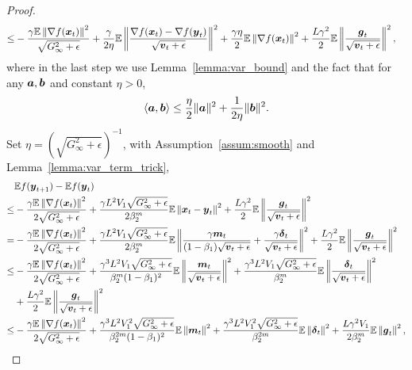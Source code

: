 \begin{proof}
\begin{align*}
\leq & -\frac{\gamma\mathbb E\left\|\nabla f(\boldsymbol{x}_t)\right\|^2}{\sqrt{G_\infty^2+\epsilon}} + \frac{\gamma}{2\eta}\mathbb E\left\| \frac{\nabla f(\boldsymbol{x}_t) - \nabla f(\boldsymbol{y}_t)}{\sqrt{\boldsymbol{v}_t+\epsilon}} \right\|^2 + \frac{\gamma\eta}{2}\mathbb E\left\| \nabla f(\boldsymbol{x}_t) \right\|^2 + \frac{L\gamma^2}{2}\mathbb E\left\| \frac{\boldsymbol{g}_{t}}{\sqrt{\boldsymbol{v}_t+\epsilon}}\right\|^2,
\end{align*}
where in the last step we use Lemma~\ref{lemma:var_bound} and the fact that for any $\boldsymbol{a},\boldsymbol{b}$ and constant $\eta>0$,
\begin{align*}
    \langle \boldsymbol{a},\boldsymbol{b} \rangle \leq \frac{\eta}{2}\|\boldsymbol{a}\|^2 + \frac{1}{2\eta}\|\boldsymbol{b}\|^2.
\end{align*}
Set $\eta=(\sqrt{G_\infty^2+\epsilon})^{-1}$, with Assumption~\ref{assum:smooth} and Lemma~\ref{lemma:var_term_trick},
\begin{align*}
& \mathbb E f(\*{y}_{t+1}) - \mathbb Ef(\*{y}_{t})\\
    \leq & -\frac{\gamma\mathbb E\left\| \nabla f(\*{x}_t)\right\|^2}{2\sqrt{G_\infty^2+\epsilon}} + \frac{\gamma L^2V_1\sqrt{G_\infty^2+\epsilon}}{2\beta_2^m}\mathbb E\left\| \*{x}_t - \*{y}_t \right\|^2 + \frac{L\gamma^2}{2}\mathbb E\left\| \frac{\*{g}_{t}}{\sqrt{\*v_t+\epsilon}}\right\|^2 \\
= & -\frac{\gamma\mathbb E\left\| \nabla f(\*{x}_t)\right\|^2}{2\sqrt{G_\infty^2+\epsilon}} + \frac{\gamma L^2V_1\sqrt{G_\infty^2+\epsilon}}{2\beta_2^m}\mathbb E\left\| \frac{\gamma\*m_t}{(1-\beta_1)\sqrt{\*v_{t}+\epsilon}} + \frac{\gamma\*\delta_{t}}{\sqrt{\*v_{t}+\epsilon}} \right\|^2 + \frac{L\gamma^2}{2}\mathbb E\left\| \frac{\*{g}_{t}}{\sqrt{\*v_t+\epsilon}}\right\|^2 \\
    \leq & -\frac{\gamma\mathbb E\left\| \nabla f(\*{x}_t)\right\|^2}{2\sqrt{G_\infty^2+\epsilon}} + \frac{\gamma^3L^2V_1\sqrt{G_\infty^2+\epsilon}}{\beta_2^m(1-\beta_1)^2}\mathbb E\left\| \frac{\*m_t}{\sqrt{\*v_{t}+\epsilon}}\right\|^2 + \frac{\gamma^3L^2V_1\sqrt{G_\infty^2+\epsilon}}{\beta_2^m}\mathbb E\left\| \frac{\*\delta_{t}}{\sqrt{\*v_{t}+\epsilon}} \right\|^2 \\
    & + \frac{L\gamma^2}{2}\mathbb E\left\| \frac{\*{g}_{t}}{\sqrt{\*v_t+\epsilon}}\right\|^2 \\
\leq & -\frac{\gamma\mathbb E\left\| \nabla f(\*{x}_t)\right\|^2}{2\sqrt{G_\infty^2+\epsilon}} + \frac{\gamma^3L^2V_1^2\sqrt{G_\infty^2+\epsilon}}{\beta_2^{2m}(1-\beta_1)^2} \mathbb E\left\| \*m_t\right\|^2 + \frac{\gamma^3L^2V_1^2\sqrt{G_\infty^2+\epsilon}}{\beta_2^{2m}}\mathbb E\left\| \*\delta_{t} \right\|^2 + \frac{L\gamma^2V_1}{2\beta_2^m}\mathbb E\left\| \*{g}_{t}\right\|^2,

\end{align*}
\end{proof}
